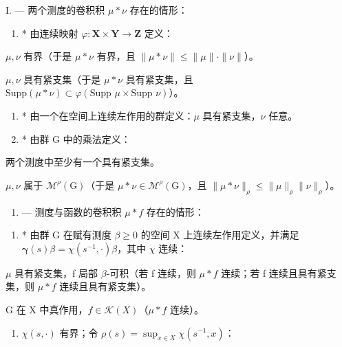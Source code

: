 
I. --- 两个测度的卷积积 \(\mu * \nu\) 存在的情形：

\begin{enumerate}
\def\labelenumi{(\alph{enumi})}
\tightlist
\item
  * 由连续映射 \(\varphi : \mathbf{X} \times \mathbf{Y} \to \mathbf{Z}\) 定义：
\end{enumerate}

\(\mu, \nu\) 有界（于是 \(\mu * \nu\) 有界，且 \(\| \mu * \nu \| \leqslant \| \mu \| \cdot \| \nu \|\)）。

\(\mu, \nu\) 具有紧支集（于是 \(\mu * \nu\) 具有紧支集，且 \(\text{Supp}(\mu * \nu) \subset \varphi(\text{Supp } \mu \times \text{Supp } \nu)\)）。

\begin{enumerate}
\def\labelenumi{(\alph{enumi})}
\setcounter{enumi}{1}
\item
  * 由一个在空间上连续左作用的群定义：\(\mu\) 具有紧支集，\(\nu\) 任意。
\item
  * 由群 G 中的乘法定义：
\end{enumerate}

两个测度中至少有一个具有紧支集。

\(\mu, \nu\) 属于 \(\mathcal{M}^{\rho}(\mathrm{G})\)（于是 \(\mu * \nu \in \mathcal{M}^{\rho}(\mathrm{G})\)，且 \(\| \mu * \nu \|_{\rho} \leqslant \| \mu \|_{\rho} \| \nu \|_{\rho}\)）。

\begin{enumerate}
\def\labelenumi{\Roman{enumi}.}
\setcounter{enumi}{1}
\tightlist
\item
  --- 测度与函数的卷积积 \(\mu*f\) 存在的情形：
\end{enumerate}

\begin{enumerate}
\def\labelenumi{(\alph{enumi})}
\tightlist
\item
  * 由群 G 在赋有测度 \(\beta \geqslant 0\) 的空间 X 上连续左作用定义，并满足 \(\pmb{\gamma}(s)\beta = \chi(s^{-1},\cdot)\beta\)，其中 \(\chi\) 连续：
\end{enumerate}

\(\mu\) 具有紧支集，f 局部 \(\beta\)-可积（若 f 连续，则 \(\mu * f\) 连续；若 f 连续且具有紧支集，则 \(\mu * f\) 连续且具有紧支集）。

G 在 X 中真作用，\(f \in \mathcal{K}(X)\)（\(\mu * f\) 连续）。

\begin{enumerate}
\def\labelenumi{(\alph{enumi})}
\setcounter{enumi}{1}
\tightlist
\item
  \(\chi(s, \cdot)\) 有界；令 \(\rho(s) = \sup_{x \in X} \chi(s^{-1}, x)\)：
\end{enumerate}

